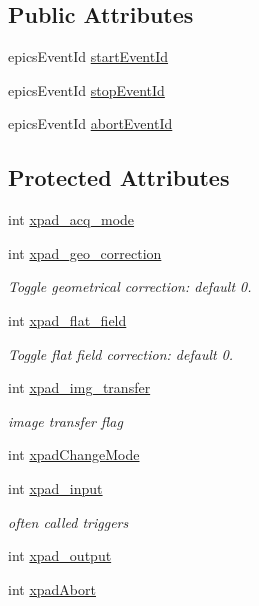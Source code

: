\subsection*{\-Public \-Attributes}
\begin{DoxyCompactItemize}
\item 
epics\-Event\-Id \hyperlink{classxpad_aca4efe99abea333e025cc2aec3350c17}{start\-Event\-Id}
\item 
epics\-Event\-Id \hyperlink{classxpad_a835f854ed3b92d3bc8eb4e2b1014c43c}{stop\-Event\-Id}
\item 
epics\-Event\-Id \hyperlink{classxpad_a368f42021436284673610b452e0b1d86}{abort\-Event\-Id}
\end{DoxyCompactItemize}
\subsection*{\-Protected \-Attributes}
\begin{DoxyCompactItemize}
\item 
int \hyperlink{classxpad_ab7be2bf57518fbcac8f93f572f20ae4f}{xpad\-\_\-acq\-\_\-mode}
\item 
int \hyperlink{classxpad_a82a425b4a530240f19a9cb4d2c3795d2}{xpad\-\_\-geo\-\_\-correction}
\begin{DoxyCompactList}\small\item\em \-Toggle geometrical correction\-: default 0. \end{DoxyCompactList}\item 
int \hyperlink{classxpad_a6883444a239704d1d808b241156babd2}{xpad\-\_\-flat\-\_\-field}
\begin{DoxyCompactList}\small\item\em \-Toggle flat field correction\-: default 0. \end{DoxyCompactList}\item 
int \hyperlink{classxpad_ac6cc32ae27434cafb507aeaa21d05a86}{xpad\-\_\-img\-\_\-transfer}
\begin{DoxyCompactList}\small\item\em image transfer flag \end{DoxyCompactList}\item 
int \hyperlink{classxpad_a55cbc1f3e75d5cd322863fb3c00f027c}{xpad\-Change\-Mode}
\item 
int \hyperlink{classxpad_a8f65d3ade5862e87afbe681372e7ab17}{xpad\-\_\-input}
\begin{DoxyCompactList}\small\item\em often called triggers \end{DoxyCompactList}\item 
int \hyperlink{classxpad_aff6cab8fd160aa9e9c1dbd4a2cb45fe6}{xpad\-\_\-output}
\item 
int \hyperlink{classxpad_ae0a204dd249083d430c3df4f409f0904}{xpad\-Abort}
\end{DoxyCompactItemize}
